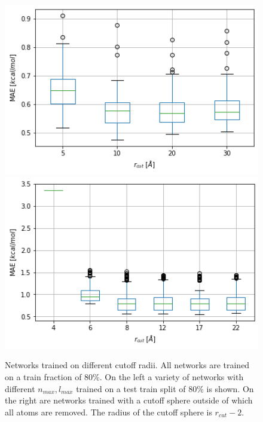 \begin{figure}[!htb]
    \includegraphics[width=1.0\textwidth]{figures/regression/snap/cut-all.png} %
  \endminipage\hfill
    \includegraphics[width=1.0\textwidth]{figures/regression/snap/cut-sphere.png}
  \endminipage\hfill
  \caption{
  Networks trained on different cutoff radii. All networks are trained on a train fraction of 80\%.
  On the left a variety of networks with different $n_{max}, l_{max}$ trained on a test train split of 80\% is shown.
  On the right are networks trained with a cutoff sphere outside of which all atoms are removed. 
  The radius of the cutoff sphere is $r_{cut}-2$.  
 }
  \label{fig:snap_hyperparameter}
\end{figure}


